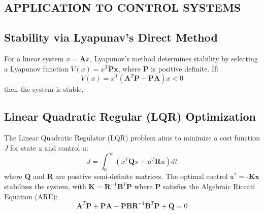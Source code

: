 \documentclass[twocolumn]{IEEEtran}
\begin{document}
\begin{samepage}
\section{APPLICATION TO CONTROL SYSTEMS}
\subsection{Stability via Lyapunav's Direct Method}
\par  For a linear system $x =\textbf{A}x$, Lyapunov’s method determines stability by selecting a Lyapunov function $V (x) = x^T\textbf{Px}$, where \textbf{P} is positive definite. If:
\begin{equation}
V(x) = x^T(\textbf{A}^T\textbf{P} + \textbf{PA})x <0
\end{equation}
then the system is stable.
\subsection{Linear Quadratic Regular (LQR) Optimization}
\par  The Linear Quadratic Regulator (LQR) problem aims to minimize a cost function \emph{J} for state x and control u:
 \begin{equation}
 J = \int_{0}^{\infty} (x^T \textbf{Q} x + u^T \textbf{R} u) dt
 \end{equation}
  where \textbf{Q} and \textbf{R} are positive semi-definite matrices. The optimal control $\texttt{u}^* = \textbf{-Kx}$ stabilizes the system, with $\textbf{K}= \textbf{R}^{-1}\textbf{B}^T\textbf{P}$ where \textbf{P} satisfies the Algebraic Riccati Equation (ARE):
 \begin{equation}
 \textbf{A}^T\textbf{P} + \textbf{PA} - \textbf{PBR}^{-1}\textbf{B}^T\textbf{P} + \textbf{Q} =0
 \end{equation}
\end{samepage}
\end{document}
